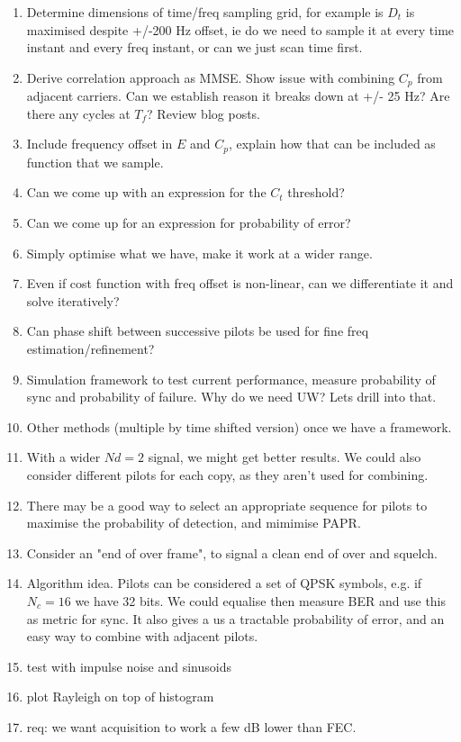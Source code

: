 \documentclass{article}
\begin{document}
\begin{enumerate}
\item Determine dimensions of time/freq sampling grid, for example is $D_t$ is maximised despite +/-200 Hz offset, ie do we need to sample it at every time instant and every freq instant, or can we just scan time first.
\item Derive correlation approach as MMSE.  Show issue with combining $C_p$ from adjacent carriers. Can we establish reason it breaks down at +/- 25 Hz?  Are there any cycles at $T_f$?  Review blog posts.
\item Include frequency offset in $E$ and $C_p$, explain how that can be included as function that we sample.
\item Can we come up with an expression for the $C_t$ threshold?
\item Can we come up for an expression for probability of error?
\item Simply optimise what we have, make it work at a wider range.
\item Even if cost function with freq offset is non-linear, can we differentiate it and solve iteratively?
\item Can phase shift between successive pilots be used for fine freq estimation/refinement?
\item Simulation framework to test current performance, measure probability of sync and probability of failure.  Why do we need UW?  Lets drill into that.
\item Other methods (multiple by time shifted version) once we have a framework.
\item With a wider $Nd=2$ signal, we might get better results.  We could also consider different pilots for each copy, as they aren't used for combining.
\item There may be a good way to select an appropriate sequence for pilots to maximise the probability of detection, and mimimise PAPR.
\item Consider an "end of over frame", to signal a clean end of over and squelch.
\item Algorithm idea. Pilots can be considered a set of QPSK symbols, e.g. if $N_c=16$ we have 32 bits. We could equalise then measure BER and use this as metric for sync.  It also gives a us a tractable probability of error, and an easy way to combine with adjacent pilots.
\item test with impulse noise and sinusoids
\item plot Rayleigh on top of histogram
\item req: we want acquisition to work a few dB lower than FEC.
\end{enumerate}
\end{document}
